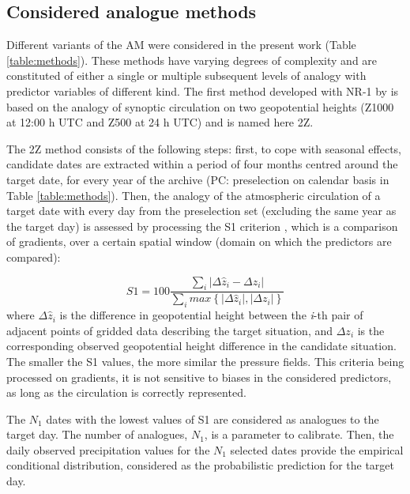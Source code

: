 \documentclass{ametsoc}
\begin{document}
\subsection{Considered analogue methods}
\label{sec:ams}

Different variants of the AM were considered in the present work (Table \ref{table:methods}). These methods have varying degrees of complexity and are constituted of either a single or multiple subsequent levels of analogy with predictor variables of different kind. The first method developed with NR-1 by \citet{Bontron2004} is based on the analogy of synoptic circulation on two geopotential heights (Z1000 at 12:00 h UTC and Z500 at 24 h UTC) and is named here 2Z.

The 2Z method consists of the following steps: first, to cope with seasonal effects, candidate dates are extracted within a period of four months centred around the target date, for every year of the archive (PC: preselection on calendar basis in Table \ref{table:methods}). Then, the analogy of the atmospheric circulation of a target date with every day from the preselection set (excluding the same year as the target day) is assessed by processing the S1 criterion \citep[Eq.\ \ref{eq:S1}, ][]{Teweles1954, Drosdowsky2003}, which is a comparison of gradients, over a certain spatial window (domain on which the predictors are compared):

\begin{equation}
\label{eq:S1}
S1=100 \frac {\displaystyle \sum_{i} \vert \Delta\hat{z}_{i} - \Delta z_{i} \vert}
{\displaystyle \sum_{i} max\left\lbrace \vert \Delta\hat{z}_{i} \vert , \vert \Delta z_{i} \vert \right\rbrace }
\end{equation}
where $\Delta \hat{z}_{i}$ is the difference in geopotential height between the \textit{i}-th pair of adjacent points of gridded data describing the target situation, and $\Delta z_{i}$ is the corresponding observed geopotential height difference in the candidate situation. The smaller the S1 values, the more similar the pressure fields. This criteria being processed on gradients, it is not sensitive to biases in the considered predictors, as long as the circulation is correctly represented.

The $N_{1}$ dates with the lowest values of S1 are considered as analogues to the target day. The number of analogues, $N_{1}$, is a parameter to calibrate. Then, the daily observed precipitation values for the $N_{1}$ selected dates provide the empirical conditional distribution, considered as the probabilistic prediction for the target day.
\end{document}
